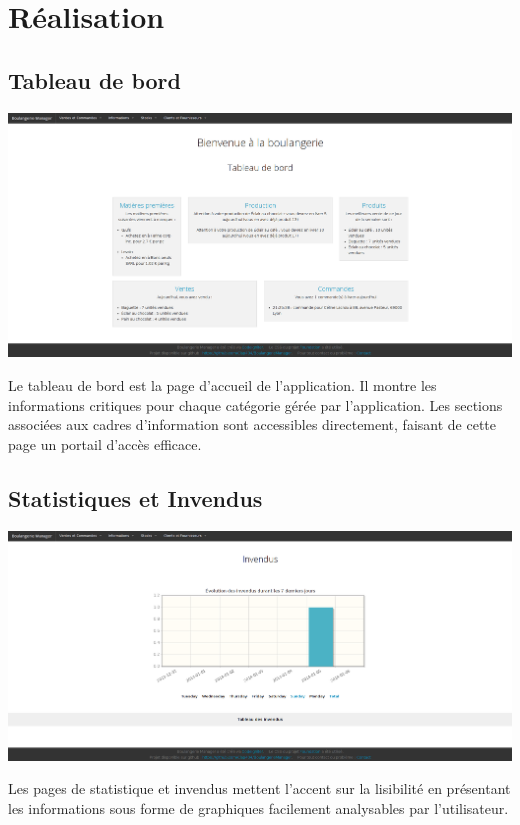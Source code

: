 \chapter{Réalisation}

\section{Tableau de bord}
\centerline{\includegraphics[width=1\textwidth]{images/tableau_de_bord.png}}
Le tableau de bord est la page d'accueil de l'application. Il montre les
informations critiques pour chaque catégorie gérée par l'application.
Les sections associées aux cadres d'information sont accessibles directement, faisant de
cette page un portail d'accès efficace.

\section{Statistiques et Invendus}
\centerline{\includegraphics[width=1\textwidth]{images/Invendus.png}}
Les pages de statistique et invendus mettent l'accent sur la lisibilité en
présentant les informations sous forme de graphiques facilement analysables
par l'utilisateur.

